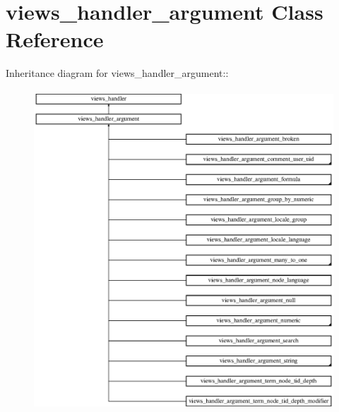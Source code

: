 \hypertarget{classviews__handler__argument}{
\section{views\_\-handler\_\-argument Class Reference}
\label{classviews__handler__argument}
}
Inheritance diagram for views\_\-handler\_\-argument::\begin{figure}[H]
\begin{center}
\leavevmode
\includegraphics[height=12cm]{classviews__handler__argument}
\end{center}
\end{figure}
